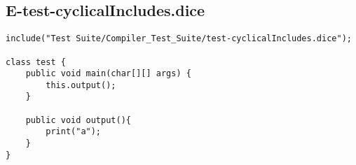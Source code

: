\subsection{E-test-cyclicalIncludes.dice}
\begin{verbatim}
include("Test Suite/Compiler_Test_Suite/test-cyclicalIncludes.dice");

class test {
	public void main(char[][] args) {
        this.output();
	}

	public void output(){
		print("a");
	}
}

\end{verbatim}